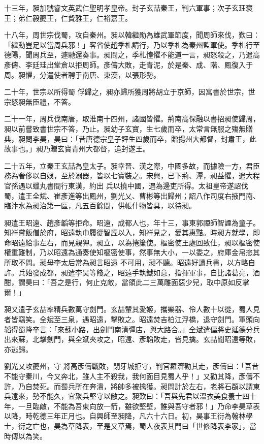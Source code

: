 \begin{pinyinscope}
 十三年，昶加號睿文英武仁聖明孝皇帝。封子玄喆秦王，判六軍事；次子玄玨褒王；弟仁毅夔王，仁贄雅王，仁裕嘉王。



 十八年，周世宗伐蜀，攻自秦州。昶以韓繼勛為雄武軍節度，聞周師來伐，歎曰：「繼勳豈足以當周兵邪！」客省使趙季札請行，乃以季札為秦州監軍使。季札行至德陽，聞周兵至，遽馳還奏事。昶問之，季札惶懼不能道一言，昶怒殺之，乃遣高彥儔、李廷珪出堂倉以拒周師。彥儔大敗，走青泥，於是秦、成、階、鳳復入于周。昶懼，分遣使者聘于南唐、東漢，以張形勢。



 二十年，世宗以所得蜀
 俘歸之，昶亦歸所獲周將胡立于京師，因寓書於世宗，世宗怒昶無臣禮，不答。



 二十一年，周兵伐南唐，取淮南十四州，諸國皆懼。荊南高保融以書招昶使歸周，昶以前嘗致書世宗不答，乃止。昶幼子玄寶，生七歲而卒，太常言無服之殤無贈典，昶問李昊，昊曰：「昔唐德宗皇子評生四歲而卒，贈揚州大都督，封肅王，此故事也。」昶乃贈玄寶青州大都督，追封遂王。



 二十五年，立秦王玄喆為皇太子。昶幸晉、漢之際，中國多故，而據險一方，君臣務為奢侈以自娛，至於溺器，皆以七寶裝之。宋興，已下荊、潭，昶益懼，遣大程官孫遇以蠟丸書間行東漢，約出
 兵以撓中國，遇為邊吏所得。太祖皇帝遂詔伐蜀，遣王全斌、崔彥進等出鳳州，劉光乂、曹彬等出歸州；詔八作司度右掖門南、臨汴水為昶治第一區，凡五百餘間，供帳什物皆具，以待昶。



 昶遣王昭遠、趙彥韜等拒命。昭遠，成都人也，年十三，事東郭禪師智諲為童子。知祥嘗飯僧於府，昭遠執巾履從智諲以入，知祥見之，愛其惠黠。時昶方就學，即命昭遠給事左右，而見親狎。昶立，以為捲簾使。樞密使王處回致仕，昶以樞密使權重難制，乃以昭遠為通奏使知樞密使事，然事無大小，一以委之，府庫金帛恣其所取不問。昶母李太后常為昶言昭遠
 不可用，昶不聽。昭遠好讀兵書，以方略自許。兵始發成都，昶遣李昊等餞之，昭遠手執鐵如意，指揮軍事，自比諸葛亮，酒酣，謂昊曰：「吾之是行，何止克敵，當領此二三萬雕面惡少兒，取中原如反掌爾！」



 昶又遣子玄喆率精兵數萬守劍門。玄喆輦其愛姬，攜樂器、伶人數十以從，蜀人見者皆竊笑。全斌至三泉，遇昭遠，擊敗之。昭遠焚吉柏江浮橋，退守劍門。軍頭向韜得蜀降卒言：「來蘇小路，出劍門南清彊店，與大路合。」全斌遣偏將史延德分兵出來蘇，北擊劍門，與全斌夾攻之，昭遠、彥韜敗走，皆見擒。玄喆聞昭遠等敗，亦逃歸。



 劉光乂攻夔州，守
 將高彥儔戰敗，閉牙城拒守，判官羅濟勸其走，彥儔曰：「吾昔不能守秦川，今又奔北，雖人主不殺我，我何面目見蜀人乎！」又勸其降，彥儔不許，乃自焚死。而蜀兵所在奔潰，將帥多被擒獲。昶問計於左右，老將石頵以謂東兵遠來，勢不能久，宜聚兵堅守以敝之。昶歎曰：「吾與先君以溫衣美食養士四十年，一旦臨敵，不能為吾東向放一箭，雖欲堅壁，誰與吾守者邪！」乃命李昊草表以降，時乾德三年正月也。自興師至昶降，凡六十六日。初，昊事王衍為翰林學士，衍之亡也，昊為草降表，至是又草焉，蜀人夜表其門曰「世修降表李家」，當時傳以為笑。




\end{pinyinscope}

